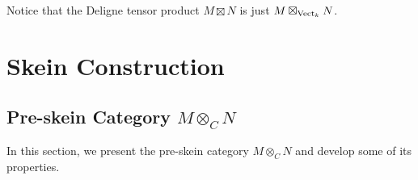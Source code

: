 \begin{remark} \label{remark/deligne-tensor-product}
  Notice that the Deligne tensor product $M \boxtimes N$ is just
  $M \boxtimes_{\operatorname{Vect}_k} N$.
\end{remark}

\section{Skein Construction}\label{section/skein-construction}

\subsection{Pre-skein Category $M\otimes_C N$}

\noindent In this section, we present the pre-skein category $M \otimes_{C} N$
and develop some of its properties.

